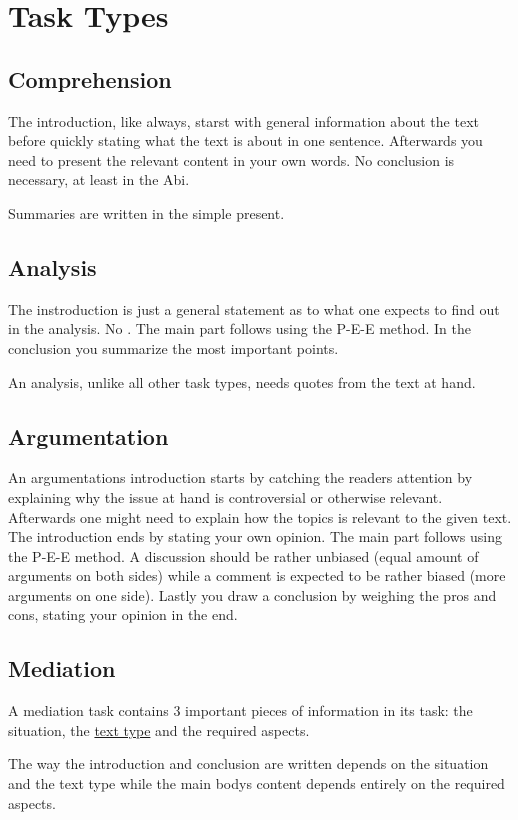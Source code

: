 \documentclass{article}
\begin{document}
\section{Task Types}
 
\subsection{Comprehension}
The introduction, like always, starst with general information about the text before quickly stating what the text is about in one sentence. \newline 
Afterwards you need to present the relevant content in your own words. \newline 
No conclusion is necessary, at least in the Abi. 
 
Summaries are written in the simple present. 
 
\subsection{Analysis} 
The instroduction is just a general statement as to what one expects to find out in the analysis. No . \newline 
The main part follows using the P-E-E method. \newline 
In the conclusion you summarize the most important points.
 
An analysis, unlike all other task types, needs quotes from the text at hand. 
 
\subsection{Argumentation}
An argumentations introduction starts by catching the readers attention by explaining why the issue at hand is controversial or otherwise relevant. Afterwards one might need to explain how the topics is relevant to the given text. The introduction ends by stating your own opinion. \newline 
The main part follows using the P-E-E method. A discussion should be rather unbiased (equal amount of arguments on both sides) while a comment is expected to be rather biased (more arguments on one side). \newline 
Lastly you draw a conclusion by weighing the pros and cons, stating your opinion in the end. 
 
\subsection{Mediation} 
A mediation task contains 3 important pieces of information in its task: the situation, the \hyperref[Text Type]{text type} and the required aspects.
 
The way the introduction and conclusion are written depends on the situation and the text type while the main bodys content depends entirely on the required aspects.
\end{document}
